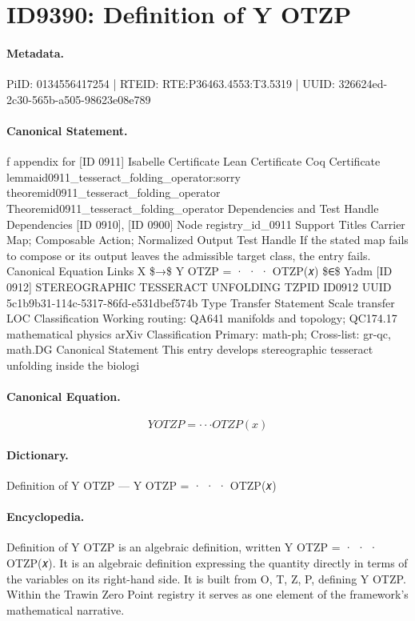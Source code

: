 \section*{ID9390: Definition of Y OTZP}
\paragraph{Metadata.}
PiID: 0134556417254 | RTEID: RTE:P36463.4553:T3.5319 | UUID: 326624ed-2c30-565b-a505-98623e08e789

\paragraph{Canonical Statement.}
f appendix for [ID 0911] Isabelle Certificate Lean Certificate Coq Certificate lemmaid0911\_tesseract\_folding\_operator:sorry theoremid0911\_tesseract\_folding\_operator Theoremid0911\_tesseract\_folding\_operator Dependencies and Test Handle Dependencies [ID 0910], [ID 0900] Node registry\_id\_0911 Support Titles Carrier Map; Composable Action; Normalized Output Test Handle If the stated map fails to compose or its output leaves the admissible target class, the entry fails. Canonical Equation Links X \$→\$ Y OTZP = · · · OTZP(𝑥) \$∈\$ Yadm [ID 0912] STEREOGRAPHIC TESSERACT UNFOLDING TZPID ID0912 UUID 5c1b9b31-114c-5317-86fd-e531dbef574b Type Transfer Statement Scale transfer LOC Classification Working routing: QA641 manifolds and topology; QC174.17 mathematical physics arXiv Classification Primary: math-ph; Cross-list: gr-qc, math.DG Canonical Statement This entry develops stereographic tesseract unfolding inside the biologi

\paragraph{Canonical Equation.}
\[
Y OTZP = · · · OTZP(𝑥)
\]

\paragraph{Dictionary.}
Definition of Y OTZP — Y OTZP = · · · OTZP(𝑥)

\paragraph{Encyclopedia.}
Definition of Y OTZP is an algebraic definition, written Y OTZP = · · · OTZP(𝑥). It is an algebraic definition expressing the quantity directly in terms of the variables on its right-hand side. It is built from O, T, Z, P, defining Y OTZP. Within the Trawin Zero Point registry it serves as one element of the framework's mathematical narrative.
